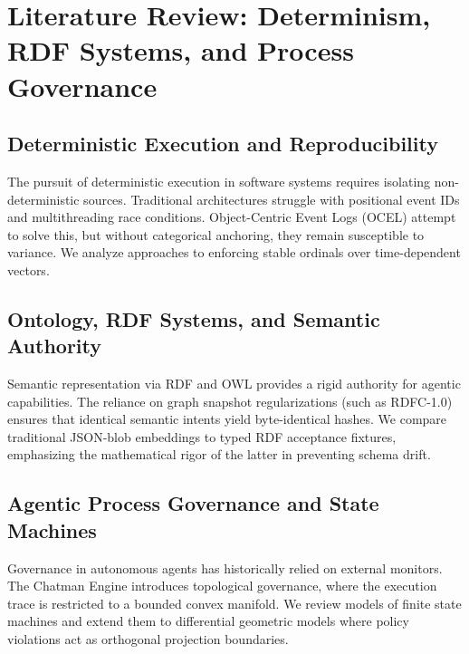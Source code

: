 \chapter{Literature Review: Determinism, RDF Systems, and Process Governance}

\section{Deterministic Execution and Reproducibility}
The pursuit of deterministic execution in software systems requires isolating non-deterministic sources. Traditional architectures struggle with positional event IDs and multithreading race conditions. Object-Centric Event Logs (OCEL) attempt to solve this, but without categorical anchoring, they remain susceptible to variance. We analyze approaches to enforcing stable ordinals over time-dependent vectors.

\section{Ontology, RDF Systems, and Semantic Authority}
Semantic representation via RDF and OWL provides a rigid authority for agentic capabilities. The reliance on graph snapshot regularizations (such as RDFC-1.0) ensures that identical semantic intents yield byte-identical hashes. We compare traditional JSON-blob embeddings to typed RDF acceptance fixtures, emphasizing the mathematical rigor of the latter in preventing schema drift.

\section{Agentic Process Governance and State Machines}
Governance in autonomous agents has historically relied on external monitors. The Chatman Engine introduces topological governance, where the execution trace is restricted to a bounded convex manifold. We review models of finite state machines and extend them to differential geometric models where policy violations act as orthogonal projection boundaries.
